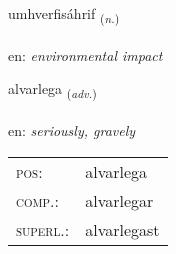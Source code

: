 \documentclass[frontgrid, backgrid]{flacards}\usepackage[]{graphicx}\usepackage[]{xcolor}
\begin{document}
\renewcommand{\blhead}{\vskip5pt {\small\bfseries\footnotesize Nafnorð | Noun }}
\renewcommand{\bcfoot}{\vskip5pt \hspace{2pt}{\small\bfseries\footnotesize 3K}}


{umhverfisáhrif \small{\textsubscript{(\textit{n.})}} \\[1ex] %
\textphonetic{[ʏmkʰvɛrvɪsaur̥ɪv]} \\
en: \emph{environmental impact} \\  [2ex]
\renewcommand*{\arraystretch}{0.8}
}

\renewcommand{\flhead}{\vskip5pt \fboxsep=0pt {\small\bfseries\footnotesize Atviksorð | Adverb}}
\renewcommand{\fcfoot}{\vskip5pt \fboxsep=0pt \hspace{2pt}{\small\bfseries\footnotesize 3K}}

\renewcommand{\blhead}{\vskip5pt {\small\bfseries\footnotesize Atviksorð | Adverb }}
\renewcommand{\bcfoot}{\vskip5pt \hspace{2pt}{\small\bfseries\footnotesize 3K}}


{alvarlega \small{\textsubscript{(\textit{adv.})}} \\[1ex] %
\textphonetic{[alvarlɛɣa]} \\
en: \emph{seriously, gravely} \\  [2ex]
\renewcommand*{\arraystretch}{0.8}
\begin{tabular}{ll}
\textsc{pos}: & alvarlega \\ 
\textsc{comp.}: & alvarlegar \\ 
\textsc{superl.}: & alvarlegast \\
\end{tabular}
}
\end{document}
